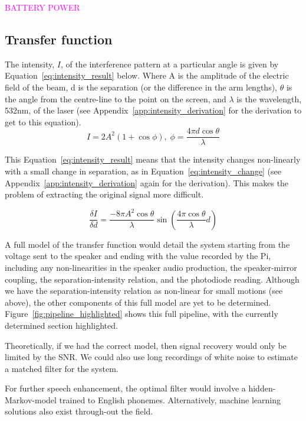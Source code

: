 \documentclass[prb,preprint]{revtex4-1}
\newcommand{\jam}{\textcolor{magenta}}
\begin{document}
\jam{BATTERY POWER}

\subsection{Transfer function}

The intensity, $I$, of the interference pattern at a particular angle is given by Equation~\ref{eq:intensity_result} below. Where A is the amplitude of the electric field of the beam, d is the separation (or the difference in the arm lengths), $\theta$ is the angle from the centre-line to the point on the screen, and $\lambda$ is the wavelength, 532nm, of the laser (see Appendix~\ref{app:intensity_derivation} for the derivation to get to this equation).
\begin{equation}
\label{eq:intensity_result}
I = 2 A^2 (1+\cos{\phi}), \; \phi = \frac{4 \pi d \cos{\theta}}{\lambda}
\end{equation}

This Equation~\ref{eq:intensity_result} means that the intensity changes non-linearly with a small change in separation, as in Equation~\ref{eq:intensity_change} (see Appendix~\ref{app:intensity_derivation} again for the derivation). This makes the problem of extracting the original signal more difficult.

\begin{equation}
\label{eq:intensity_change}
	\frac{\delta I}{\delta d} = \frac{- 8 \pi A^2 \cos{\theta}}{\lambda} \sin{(\frac{4 \pi \cos{\theta}}{\lambda} d)}
\end{equation}

A full model of the transfer function would detail the system starting from the voltage sent to the speaker and ending with the value recorded by the Pi, including any non-linearities in the speaker audio production, the speaker-mirror coupling, the separation-intensity relation, and the photodiode reading. Although we have the separation-intensity relation as non-linear for small motions (see above), the other components of this full model are yet to be determined. Figure~\ref{fig:pipeline_highlighted} shows this full pipeline, with the currently determined section highlighted.


Theoretically, if we had the correct model, then signal recovery would only be limited by the SNR. We could also use long recordings of white noise to estimate a matched filter for the system.


For further speech enhancement, the optimal filter would involve a hidden-Markov-model trained to English phonemes. Alternatively, machine learning solutions also exist through-out the field.
\end{document}
